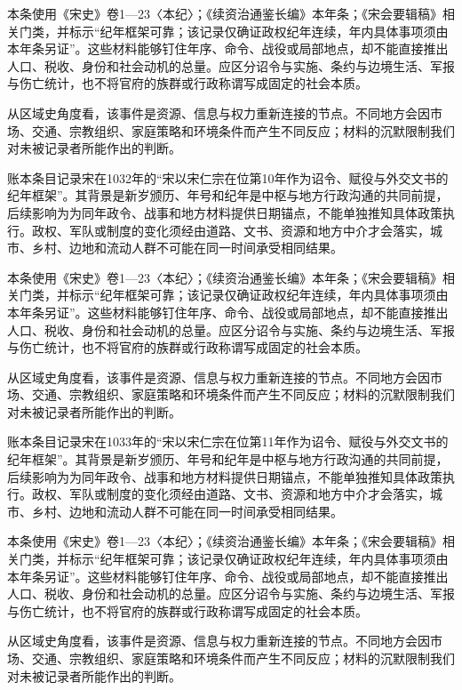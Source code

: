 本条使用《宋史》卷1—23〈本纪〉；《续资治通鉴长编》本年条；《宋会要辑稿》相关门类，并标示“纪年框架可靠；该记录仅确证政权纪年连续，年内具体事项须由本年条另证”。这些材料能够钉住年序、命令、战役或局部地点，却不能直接推出人口、税收、身份和社会动机的总量。应区分诏令与实施、条约与边境生活、军报与伤亡统计，也不将官府的族群或行政称谓写成固定的社会本质。

从区域史角度看，该事件是资源、信息与权力重新连接的节点。不同地方会因市场、交通、宗教组织、家庭策略和环境条件而产生不同反应；材料的沉默限制我们对未被记录者所能作出的判断。

账本条目记录宋在1032年的“宋以宋仁宗在位第10年作为诏令、赋役与外交文书的纪年框架”。其背景是新岁颁历、年号和纪年是中枢与地方行政沟通的共同前提，后续影响为为同年政令、战事和地方材料提供日期锚点，不能单独推知具体政策执行。政权、军队或制度的变化须经由道路、文书、资源和地方中介才会落实，城市、乡村、边地和流动人群不可能在同一时间承受相同结果。

本条使用《宋史》卷1—23〈本纪〉；《续资治通鉴长编》本年条；《宋会要辑稿》相关门类，并标示“纪年框架可靠；该记录仅确证政权纪年连续，年内具体事项须由本年条另证”。这些材料能够钉住年序、命令、战役或局部地点，却不能直接推出人口、税收、身份和社会动机的总量。应区分诏令与实施、条约与边境生活、军报与伤亡统计，也不将官府的族群或行政称谓写成固定的社会本质。

从区域史角度看，该事件是资源、信息与权力重新连接的节点。不同地方会因市场、交通、宗教组织、家庭策略和环境条件而产生不同反应；材料的沉默限制我们对未被记录者所能作出的判断。

账本条目记录宋在1033年的“宋以宋仁宗在位第11年作为诏令、赋役与外交文书的纪年框架”。其背景是新岁颁历、年号和纪年是中枢与地方行政沟通的共同前提，后续影响为为同年政令、战事和地方材料提供日期锚点，不能单独推知具体政策执行。政权、军队或制度的变化须经由道路、文书、资源和地方中介才会落实，城市、乡村、边地和流动人群不可能在同一时间承受相同结果。

本条使用《宋史》卷1—23〈本纪〉；《续资治通鉴长编》本年条；《宋会要辑稿》相关门类，并标示“纪年框架可靠；该记录仅确证政权纪年连续，年内具体事项须由本年条另证”。这些材料能够钉住年序、命令、战役或局部地点，却不能直接推出人口、税收、身份和社会动机的总量。应区分诏令与实施、条约与边境生活、军报与伤亡统计，也不将官府的族群或行政称谓写成固定的社会本质。

从区域史角度看，该事件是资源、信息与权力重新连接的节点。不同地方会因市场、交通、宗教组织、家庭策略和环境条件而产生不同反应；材料的沉默限制我们对未被记录者所能作出的判断。

